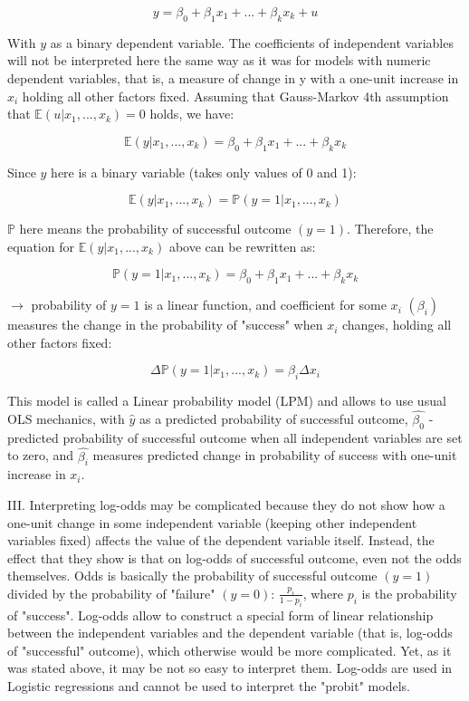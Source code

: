 \documentclass{article}
\begin{document}
$$y = \beta_0 + \beta_{1}x_1 + ... + \beta_{k}x_k + u$$

With $y$ as a binary dependent variable. The coefficients of independent variables will not be interpreted here the same way as it was for models with numeric dependent variables, that is, a measure of change in y with a one-unit increase in $x_{i}$ holding all other factors fixed. Assuming that Gauss-Markov 4th assumption that $\mathbb{E}(u | x_{1},...,x_k) = 0$ holds, we have:

$$\mathbb{E}(y | x_{1},...,x_k) = \beta_0 + \beta_{1}x_1 + ... + \beta_{k}x_k$$

Since $y$ here is a binary variable (takes only values of 0 and 1):

$$\mathbb{E}(y | x_{1}, ..., x_k) = \mathbb{P}(y = 1 | x_{1}, ..., x_k)$$

$\mathbb{P}$ here means the probability of successful outcome $(y=1)$. Therefore, the equation for $\mathbb{E}(y | x_{1}, ..., x_k)$ above can be rewritten as:

$$\mathbb{P}(y = 1 | x_{1}, ..., x_k) = \beta_0 + \beta_{1}x_1 + ... + \beta_{k}x_k$$

$\rightarrow$ probability of $y = 1$ is a linear function, and coefficient for some $x_i$ $(\beta_i)$ measures the change in the probability of "success" when $x_i$ changes, holding all other factors fixed:

$$\Delta\mathbb{P}(y = 1 | x_{1}, ..., x_k) = \beta_i\Delta x_i$$

This model is called a Linear probability model (LPM) and allows to use usual OLS mechanics, with $\hat{y}$ as a predicted probability of successful outcome, $\hat{\beta_0}$ - predicted probability of successful outcome when all independent variables are set to zero, and $\hat{\beta_i}$ measures predicted change in probability of success with one-unit increase in $x_i$. 

III. Interpreting log-odds may be complicated because they do not show how a one-unit change in some independent variable (keeping other independent variables fixed) affects the value of the dependent variable itself. Instead, the effect that they show is that on log-odds of successful outcome, even not the odds themselves. 
Odds is basically the probability of successful outcome $(y = 1)$ divided by the probability of "failure" $(y = 0)$: $\frac{p_i}{1 - p_i}$, where $p_i$ is the probability of "success". 
Log-odds allow to construct a special form of linear relationship between the independent variables and the dependent variable (that is, log-odds of "successful" outcome), which otherwise would be more complicated. Yet, as it was stated above, it may be not so easy to interpret them.
Log-odds are used in Logistic regressions and cannot be used to interpret the "probit" models.
\\
\end{document}

